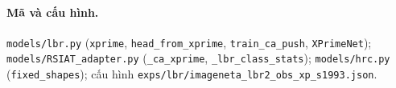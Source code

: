 \documentclass[11pt]{article}
\begin{document}
\paragraph{Mã và cấu hình.} \texttt{models/lbr.py} (\texttt{xprime}, \texttt{head\_from\_xprime},
\texttt{train\_ca\_push}, \texttt{XPrimeNet}); \texttt{models/RSIAT\_adapter.py} (\texttt{\_ca\_xprime},
\texttt{\_lbr\_class\_stats}); \texttt{models/hrc.py} (\texttt{fixed\_shapes}); cấu hình
\texttt{exps/lbr/imageneta\_lbr2\_obs\_xp\_s1993.json}.
\end{document}
